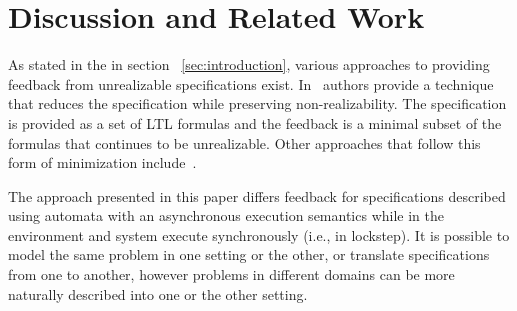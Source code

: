 \section{Discussion and Related Work}\label{sec:discussion}

As stated in the in section ~\ref{sec:introduction}, various approaches to providing feedback from unrealizable specifications exist. In~\cite{DBLP:conf/fmcad/KonighoferHB09} authors provide a technique that reduces the specification while preserving non-realizability. The specification is provided as a set of LTL formulas and the feedback is a minimal subset of the formulas that continues to be unrealizable. Other approaches that follow this form of minimization include~\cite{DBLP:journals/scp/Schuppan12}.
 
The approach presented in this paper differs feedback for specifications described using automata with an asynchronous execution semantics while in \cite{DBLP:conf/fmcad/KonighoferHB09} the environment and system execute synchronously (i.e., in lockstep). It is possible to model the same problem in one setting or the other, or translate specifications from one to another, however problems in different domains can  be more naturally described into one or the other setting.


